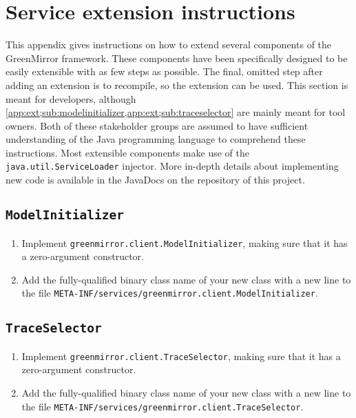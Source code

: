 \section{Service extension instructions}\label{app:ext}
This appendix gives instructions on how to extend several components of the GreenMirror framework. These components have been specifically designed to be easily extensible with as few steps as possible. The final, omitted step after adding an extension is to recompile, so the extension can be used. This section is meant for developers, although \cref{app:ext;sub:modelinitializer,app:ext;sub:traceselector} are mainly meant for tool owners. Both of these stakeholder groups are assumed to have sufficient understanding of the Java programming language to comprehend these instructions. Most extensible components make use of the \lstinline{java.util.ServiceLoader} injector. More in-depth details about implementing new code is available in the JavaDocs on the repository of this project.
\subsection{\texttt{ModelInitializer}}\label{app:ext;sub:modelinitializer}
\begin{enumerate}
  \item Implement \lstinline{greenmirror.client.ModelInitializer}, making sure that it has a zero-argument constructor.
  \item Add the fully-qualified binary class name of your new class with a new line to the file \lstinline{META-INF/services/greenmirror.client.ModelInitializer}.
\end{enumerate}
\subsection{\texttt{TraceSelector}}\label{app:ext;sub:traceselector}
\begin{enumerate}
  \item Implement \lstinline{greenmirror.client.TraceSelector}, making sure that it has a zero-argument constructor.
  \item Add the fully-qualified binary class name of your new class with a new line to the file \lstinline{META-INF/services/greenmirror.client.TraceSelector}.
\end{enumerate}
